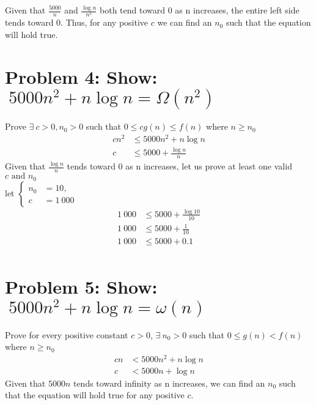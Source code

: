 \documentclass{article}
\begin{document}
    Given that \(\frac{5000}{n}\) and \(\frac{\log n}{n^2}\) both tend toward 0 as n increases, the entire left side tends toward 0.
    Thus, for any positive \(c\) we can find an \(n_0\) such that the equation will hold true.

\section{Problem 4: Show: \(\medspace 5000n^2 + n \log n = \Omega(n^2)\)}
    Prove \(\exists \medspace c > 0, n_0 > 0 \) such that \(0 \le c g(n) \le f(n) \) where \(n \ge n_0\) \\
    \begin{align}
        c n^2 & \le 5000n^2 + n \log n \\
        c & \le 5000 + \frac{\log n}{n}
    \end{align}
    Given that \(\frac{\log n}{n}\) tends toward 0 as n increases, let us prove at least one valid \(c \text{ and } n_0\) \\
    let
    \(\begin{cases}
        n_0 & = 10, \\
        c & = 1~000
    \end{cases}\)
    \begin{align}
        1~000 & \le 5000 + \frac{\log 10}{10} \\
        1~000 & \le 5000 + \frac{1}{10} \\
        1~000 & \le 5000 + 0.1 \\
    \end{align}

\section{Problem 5: Show: \(\medspace 5000n^2 + n \log n = \omega(n)\)}
    Prove for every positive constant \(c > 0\), \(\exists \medspace n_0 > 0 \) such that \(0 \le g(n) < f(n) \) where \(n \ge n_0\) \\
    \begin{align}
        c n & < 5000n^2 + n \log n \\
        c & < 5000n + \log n
    \end{align}
    Given that \(5000n\) tends toward infinity as n increases, we can find an \(n_0\) such that the equation will hold true for any positive \(c\).
\end{document}
